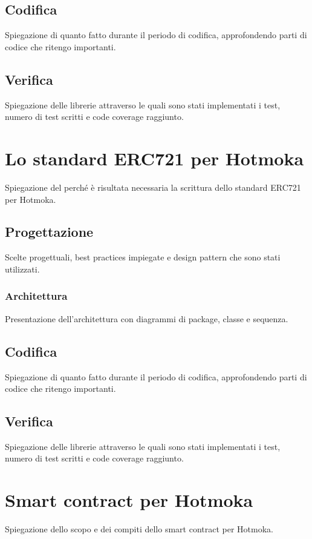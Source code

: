 \subsection{Codifica}
Spiegazione di quanto fatto durante il periodo di codifica, approfondendo parti di codice che ritengo importanti.

\subsection{Verifica}
Spiegazione delle librerie attraverso le quali sono stati implementati i test, numero di test scritti e code coverage raggiunto.


\section{Lo standard ERC721 per Hotmoka}
Spiegazione del perché è risultata necessaria la scrittura dello standard ERC721 per Hotmoka.

\subsection{Progettazione}
Scelte progettuali, best practices impiegate e design pattern che sono stati utilizzati. 

\subsubsection{Architettura}
Presentazione dell'architettura con diagrammi di package, classe e sequenza.

\subsection{Codifica}
Spiegazione di quanto fatto durante il periodo di codifica, approfondendo parti di codice che ritengo importanti.

\subsection{Verifica}
Spiegazione delle librerie attraverso le quali sono stati implementati i test, numero di test scritti e code coverage raggiunto.


\section{Smart contract per Hotmoka}
Spiegazione dello scopo e dei compiti dello smart contract per Hotmoka.

